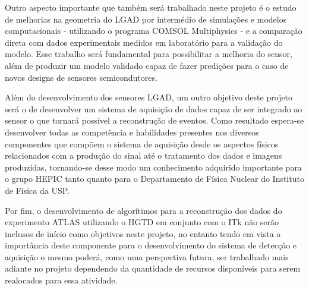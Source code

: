 Outro aspecto importante que também será trabalhado neste projeto é o estudo de melhorias na geometria do LGAD por intermédio de simulações e modelos computacionais - utilizando o programa COMSOL Multiphysics \cite{COMSOL} - e a comparação direta com dados experimentais medidos em laboratório para a validação do modelo. Esse trabalho será fundamental para possibilitar a melhoria do sensor, além de produzir um modelo validado capaz de fazer predições para o caso de novos designs de sensores semicondutores. 

Além do desenvolvimento dos sensores LGAD, um outro objetivo deste projeto será o de desenvolver um sistema de aquisição de dados capaz de ser integrado ao sensor o que tornará possível a reconstrução de eventos. Como resultado espera-se desenvolver todas as competência e habilidades presentes nos diversos componentes que compõem o sistema de aquisição desde os aspectos físicos relacionados com a produção do sinal até o tratamento dos dados e imagens produzidas, tornando-se desse modo um conhecimento adquirido importante para o grupo HEPIC tanto quanto para o Departamento de Física Nuclear do Instituto de Física da USP.

Por fim, o desenvolvimento de algorítimos para a reconstrução dos dados do experimento ATLAS utilizando o HGTD em conjunto com o ITk não serão inclusos de início como objetivos neste projeto, no entanto tendo em vista a importância deste componente para o desenvolvimento do sistema de detecção e aquisição o mesmo poderá, como uma perspectiva futura, ser trabalhado mais adiante no projeto dependendo da quantidade de recursos disponíveis para serem realocados para essa atividade.  

